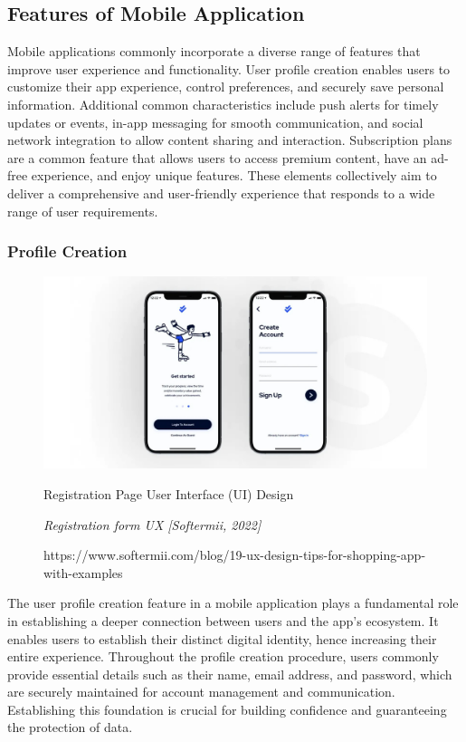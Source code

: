 \subsection{Features of Mobile Application}
Mobile applications commonly incorporate a diverse range of features that improve user experience and functionality. User profile creation enables users to customize their app experience, control preferences, and securely save personal information. Additional common characteristics include push alerts for timely updates or events, in-app messaging for smooth communication, and social network integration to allow content sharing and interaction. Subscription plans are a common feature that allows users to access premium content, have an ad-free experience, and enjoy unique features. These elements collectively aim to deliver a comprehensive and user-friendly experience that responds to a wide range of user requirements.

\subsubsection{Profile Creation}
\begin{figure}[h]
    \centering
    \includegraphics[width=0.8\linewidth]{mainmatter/images/userprofile.jpg}
    \caption{Registration Page User Interface (UI) Design}
    \caption*{\textit{Registration form UX [Softermii, 2022]}}
    \caption*{https://www.softermii.com/blog/19-ux-design-tips-for-shopping-app-with-examples}
    \label{fig:myfig10}
\end{figure}
The user profile creation feature in a mobile application plays a fundamental role in establishing a deeper connection between users and the app's ecosystem. It enables users to establish their distinct digital identity, hence increasing their entire experience. Throughout the profile creation procedure, users commonly provide essential details such as their name, email address, and password, which are securely maintained for account management and communication. Establishing this foundation is crucial for building confidence and guaranteeing the protection of data. \pagebreak


